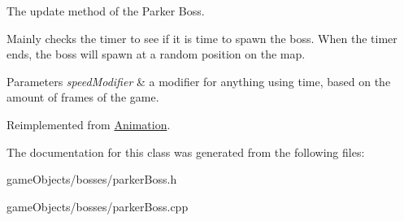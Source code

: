 The update method of the Parker Boss. 

Mainly checks the timer to see if it is time to spawn the boss. When the timer ends, the boss will spawn at a random position on the map. 
\begin{DoxyParams}{Parameters}
{\em speed\+Modifier} & a modifier for anything using time, based on the amount of frames of the game. \\
\hline
\end{DoxyParams}


Reimplemented from \hyperlink{class_animation_ae17ebf5f4b47801e460eb63342d858e8}{Animation}.



The documentation for this class was generated from the following files\+:\begin{DoxyCompactItemize}
\item 
game\+Objects/bosses/parker\+Boss.\+h\item 
game\+Objects/bosses/parker\+Boss.\+cpp\end{DoxyCompactItemize}
